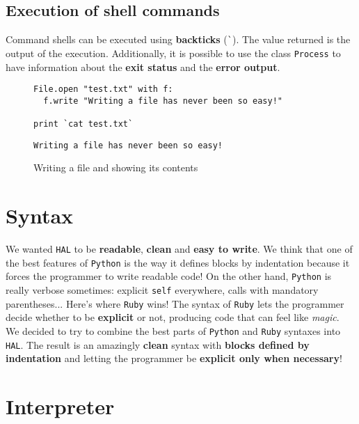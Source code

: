 \documentclass[a4paper,11pt]{article}
\begin{document}
\subsection{Execution of shell commands}
Command shells can be executed using \textbf{backticks} (\texttt{\`}). The value returned is the output
  of the execution. Additionally, it is possible to use the class \texttt{Process} to have information
  about the \textbf{exit status} and the \textbf{error output}.
\begin{figure}[h!]
\begin{lstlisting}[language=hal]
File.open "test.txt" with f:
  f.write "Writing a file has never been so easy!"

print `cat test.txt`
\end{lstlisting}
\begin{lstlisting}[language=output]
Writing a file has never been so easy!
\end{lstlisting}
\caption{Writing a file and showing its contents}
\label{backticks}
\end{figure}
\clearpage
\section{Syntax}
We wanted \texttt{HAL} to be \textbf{readable}, \textbf{clean} and \textbf{easy to write}. We think that one of the
  best features of \texttt{Python} is the way it defines blocks by indentation because it forces the programmer
  to write readable code! On the other hand, \texttt{Python} is really verbose sometimes: explicit \texttt{self} everywhere,
  calls with mandatory parentheses... Here's where \texttt{Ruby} wins! The syntax of \texttt{Ruby} lets the programmer
  decide whether to be \textbf{explicit} or not, producing code that can feel like \emph{magic}.
\\
We decided to try to combine the best parts of \texttt{Python} and \texttt{Ruby} syntaxes into \texttt{HAL}. The result
  is an amazingly \textbf{clean} syntax with \textbf{blocks defined by indentation} and letting the programmer
  be \textbf{explicit only when necessary}!
\clearpage
\section{Interpreter}
\end{document}
